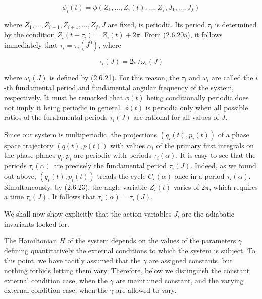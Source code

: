 \documentclass{article}
\begin{document}
\begin{equation*}
\phi_{i}(t)=\phi\left(Z_{1}, \ldots, Z_{i}(t), \ldots, Z_{f}, J_{1}, \ldots, J_{f}\right) \tag{2.6.48}
\end{equation*}
 
where $Z_{1}, \ldots, Z_{i-1}, Z_{i+1}, \ldots, Z_{f}, J$ are fixed, is periodic. Its period $\tau_{i}$ is determined by the condition $Z_{i}\left(t+\tau_{i}\right)=Z_{i}(t)+2 \pi$. From (2.6.20a), it follows immediately that $\tau_{i}=\tau_{i}\left(J^{0}\right)$, where
 
\begin{equation*}
\tau_{i}(J)=2 \pi / \omega_{i}(J) \tag{2.6.49}
\end{equation*}
 
where $\omega_{i}(J)$ is defined by (2.6.21). For this reason, the $\tau_{i}$ and $\omega_{i}$ are called the $i$-th fundamental period and fundamental angular frequency of the system, respectively. It must be remarked that $\phi(t)$ being conditionally periodic does not imply it being periodic in general. $\phi(t)$ is periodic only when all possible ratios of the fundamental periods $\tau_{i}(J)$ are rational for all values of $J$.

Since our system is multiperiodic, the projections $\left(q_{i}(t), p_{i}(t)\right)$ of a phase space trajectory $(q(t), p(t))$ with values $\alpha_{i}$ of the primary first integrals on the phase planes $q_{i}, p_{i}$ are periodic with periods $\tau_{i}(\alpha)$. It is easy to see that the periods $\tau_{i}(\alpha)$ are precisely the fundamental period $\tau_{i}(J)$. Indeed, as we found out above, $\left(q_{i}(t), p_{i}(t)\right)$ treads the cycle $C_{i}(\alpha)$ once in a period $\tau_{i}(\alpha)$. Simultaneously, by (2.6.23), the angle variable $Z_{i}(t)$ varies of $2 \pi$, which requires a time $\tau_{i}(J)$. It follows that $\tau_{i}(\alpha)=\tau_{i}(J)$.

We shall now show explicitly that the action variables $J_{i}$ are the adiabatic invariants looked for.

The Hamiltonian $H$ of the system depends on the values of the parameters
$\gamma$ defining quantitatively the external conditions to which the system is subject. To this point, we have tacitly assumed that the $\gamma$ are assigned constants, but nothing forbids letting them vary. Therefore, below we distinguish the constant external condition case, when the $\gamma$ are maintained constant, and the varying external condition case, when the $\gamma$ are allowed to vary.
\end{document}
